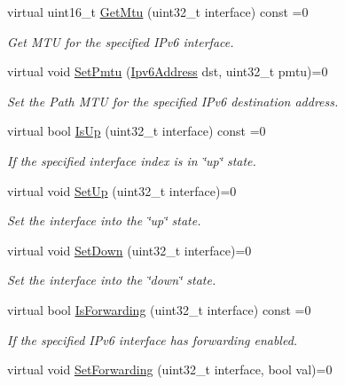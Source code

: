 \begin{DoxyCompactItemize}
virtual uint16\+\_\+t \hyperlink{classns3_1_1Ipv6_a2eb71c704b0ed9f92161a988b644600d}{Get\+Mtu} (uint32\+\_\+t interface) const =0
\begin{DoxyCompactList}\small\item\em Get M\+TU for the specified I\+Pv6 interface. \end{DoxyCompactList}\item 
virtual void \hyperlink{classns3_1_1Ipv6_a2f791bd08927bcbbba2694813cb52710}{Set\+Pmtu} (\hyperlink{classns3_1_1Ipv6Address}{Ipv6\+Address} dst, uint32\+\_\+t pmtu)=0
\begin{DoxyCompactList}\small\item\em Set the Path M\+TU for the specified I\+Pv6 destination address. \end{DoxyCompactList}\item 
virtual bool \hyperlink{classns3_1_1Ipv6_a4aad08a05734df75ca70bff43188068f}{Is\+Up} (uint32\+\_\+t interface) const =0
\begin{DoxyCompactList}\small\item\em If the specified interface index is in \char`\"{}up\char`\"{} state. \end{DoxyCompactList}\item 
virtual void \hyperlink{classns3_1_1Ipv6_a8e61d85ec7fd342ed38fef2d040ed1b9}{Set\+Up} (uint32\+\_\+t interface)=0
\begin{DoxyCompactList}\small\item\em Set the interface into the \char`\"{}up\char`\"{} state. \end{DoxyCompactList}\item 
virtual void \hyperlink{classns3_1_1Ipv6_ada8ade0638959d7acf65682580c43ee6}{Set\+Down} (uint32\+\_\+t interface)=0
\begin{DoxyCompactList}\small\item\em Set the interface into the \char`\"{}down\char`\"{} state. \end{DoxyCompactList}\item 
virtual bool \hyperlink{classns3_1_1Ipv6_a7240bf60410f8398d072641c6460339f}{Is\+Forwarding} (uint32\+\_\+t interface) const =0
\begin{DoxyCompactList}\small\item\em If the specified I\+Pv6 interface has forwarding enabled. \end{DoxyCompactList}\item 
virtual void \hyperlink{classns3_1_1Ipv6_a8f7c711267860c54bf3a645b24bf2eef}{Set\+Forwarding} (uint32\+\_\+t interface, bool val)=0

\end{DoxyCompactItemize}
